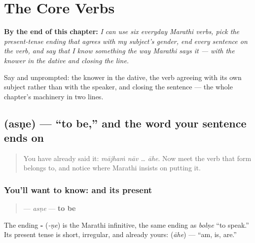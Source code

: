 
\chapter{The Core Verbs}
\label{ch:mr-core-verbs}

\begin{chapteropening}
\textbf{By the end of this chapter:} \emph{I can use six everyday Marathi verbs, pick the present-tense ending that agrees with my subject's gender, end every sentence on the verb, and say that I know something the way Marathi says it — with the knower in the dative and  closing the line.}

Say    and    unprompted: the knower in the dative, the verb agreeing with its own subject rather than with the speaker, and  closing the sentence — the whole chapter's machinery in two lines.
\end{chapteropening}

\section[asṇe]{ (asṇe) — \textquotedblleft{}to be,\textquotedblright{} and the word your sentence ends on}

\label{lesson:MR-C07-asne}



\begin{quote}
You have already said it: \emph{mājhaṁ nāv … āhe}. Now meet the verb that form belongs to, and notice where Marathi insists on putting it.
\end{quote}

\subsection*{You'll want to know:  and its present }
\begin{quote}
\textbf{} — \emph{asṇe} — \textbf{to be}
\end{quote}

The ending \textbf{-} (\emph{-ṇe}) is the Marathi infinitive, the same ending as \emph{bolṇe} \textquotedblleft{}to speak.\textquotedblright{} Its present tense is short, irregular, and already yours: \textbf{} (\emph{āhe}) — \textquotedblleft{}am, is, are.\textquotedblright{}

